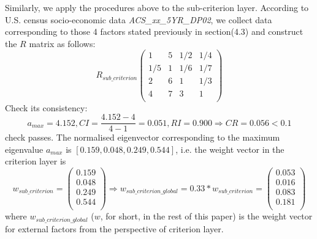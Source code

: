 \documentclass[12pt]{article}
\begin{document}
Similarly, we apply the procedures above to the sub-criterion layer. According to U.S. census socio-economic data \textit{ACS\_xx\_5YR\_DP02}, we collect data corresponding to those 4 factors stated previously in section(4.3) and construct the $R$ matrix as follows:
$$ R_{sub\_criterion}
  \begin{pmatrix}
  {1} & {5} & {{1}/{2}}  & {{1}/{4}} \\
  {{1}/{5}} & {1} & {{1}/{6}}  & {{1}/{7}}\\
  {2} & {6} & {1}  & {{1}/{3}}\\
  {4} & {7} & {3}  & {1}\\
  \end{pmatrix}
$$
Check its consistency:
$$
a_{max} = 4.152, CI = \frac{4.152-4}{4-1}=0.051, RI=0.900 \Rightarrow CR = 0.056 < 0.1
$$ 
check passes. The normalised eigenvector corresponding to the maximum eigenvalue $a_{max}$ is $[0.159, 0.048, 0.249, 0.544]$, i.e. the weight vector in the criterion layer is
$$ w_{sub\_criterion} =
  \begin{pmatrix}
    0.159 \\
    0.048 \\
    0.249 \\
    0.544 \\
  \end{pmatrix} \Rightarrow
  w_{sub\_criterion\_global} = 0.33* w_{sub\_criterion}=
  \begin{pmatrix}
    0.053 \\
    0.016 \\
    0.083 \\
    0.181 \\
  \end{pmatrix}
$$
where $w_{sub\_criterion\_global}$ ($w$, for short, in the rest of this paper) is the weight vector for external factors from the perspective of criterion layer.
\end{document}

